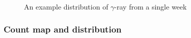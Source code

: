 \documentclass{beamer}
\begin{document}
\begin{frame}
\begin{figure}
\begin{minipage}[b]{0.49\textwidth}
    \end{minipage}
    \caption{An example distribution of $\gamma$-ray from a single week}
    \label{fig:exphotondist}
\end{figure}
\end{frame}

\begin{frame}\frametitle{Count map and distribution}
  \begin{figure}
      \centering
  \end{figure}
\end{frame}
\end{document}
